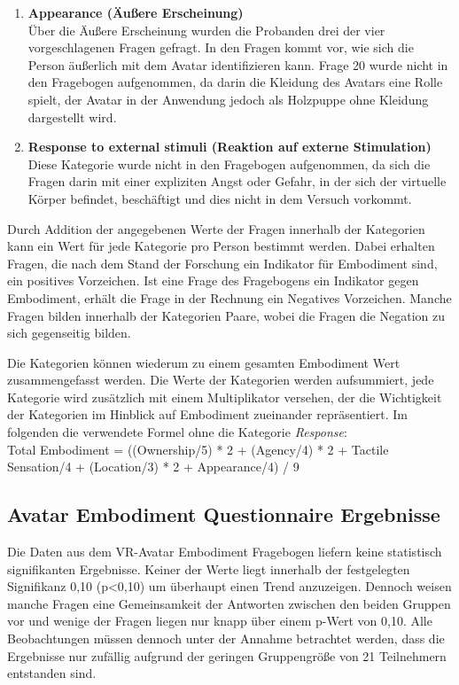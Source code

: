 \begin{enumerate}
\item\textbf{Appearance (Äußere Erscheinung)}\\
Über die Äußere Erscheinung wurden die Probanden drei der vier vorgeschlagenen Fragen gefragt. In den Fragen kommt vor, wie sich die Person äußerlich mit dem Avatar identifizieren kann. Frage 20 wurde nicht in den Fragebogen aufgenommen, da darin die Kleidung des Avatars eine Rolle spielt, der Avatar in der Anwendung jedoch als Holzpuppe ohne Kleidung dargestellt wird.

\item\textbf{Response to external stimuli (Reaktion auf externe Stimulation)}\\
Diese Kategorie wurde nicht in den Fragebogen aufgenommen, da sich die Fragen darin mit einer expliziten Angst oder Gefahr, in der sich der virtuelle Körper befindet, beschäftigt und dies nicht in dem Versuch vorkommt.

\end{enumerate}

Durch Addition der angegebenen Werte der Fragen innerhalb der Kategorien kann ein Wert für jede Kategorie pro Person bestimmt werden. Dabei erhalten Fragen, die nach dem Stand der Forschung ein Indikator für Embodiment sind, ein positives Vorzeichen. Ist eine Frage des Fragebogens ein Indikator gegen Embodiment, erhält die Frage in der Rechnung ein Negatives Vorzeichen.
Manche Fragen bilden innerhalb der Kategorien Paare, wobei die Fragen die Negation zu sich gegenseitig bilden.

Die Kategorien können wiederum zu einem gesamten Embodiment Wert zusammengefasst werden. Die Werte der Kategorien werden aufsummiert, jede Kategorie wird zusätzlich mit einem Multiplikator versehen, der die Wichtigkeit der Kategorien im Hinblick auf Embodiment  zueinander repräsentiert. Im folgenden die verwendete Formel ohne die Kategorie \textit{Response}:\\
Total Embodiment = ((Ownership/5) * 2 + (Agency/4) * 2 + Tactile Sensation/4 + (Location/3) * 2 + Appearance/4) / 9




\subsection{Avatar Embodiment Questionnaire Ergebnisse}
Die Daten aus dem VR-Avatar Embodiment Fragebogen liefern keine statistisch signifikanten Ergebnisse. Keiner der Werte liegt innerhalb der festgelegten Signifikanz 0,10 (p<0,10) um überhaupt einen Trend anzuzeigen. Dennoch weisen manche Fragen eine Gemeinsamkeit der Antworten zwischen den beiden Gruppen vor und wenige der Fragen liegen nur knapp über einem p-Wert von 0,10. Alle Beobachtungen müssen dennoch unter der Annahme betrachtet werden, dass die Ergebnisse nur zufällig aufgrund der geringen Gruppengröße von 21 Teilnehmern entstanden sind.

